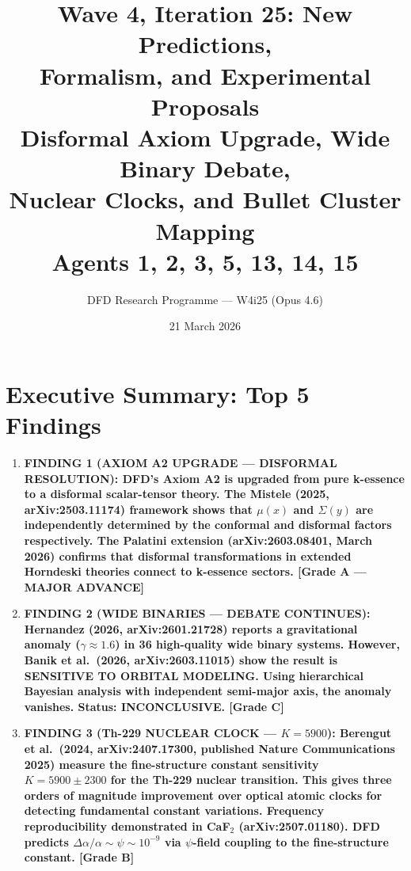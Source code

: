 \documentclass[11pt]{article}
\title{\textbf{Wave 4, Iteration 25: New Predictions,\\
Formalism, and Experimental Proposals}\\[12pt]
{\large Disformal Axiom Upgrade, Wide Binary Debate,\\
Nuclear Clocks, and Bullet Cluster Mapping}\\[4pt]
{\large Agents 1, 2, 3, 5, 13, 14, 15}}
\author{DFD Research Programme --- W4i25 (Opus 4.6)}
\date{21 March 2026}
\begin{document}
\maketitle
\tableofcontents
\newpage

\section*{Executive Summary: Top 5 Findings}

\begin{tcolorbox}[colback=blue!5!white, colframe=blue!70!black,
  title=\textbf{W4i25 TOP 5 FINDINGS --- PREDICTIONS TEAM}]

\begin{enumerate}

\item \textbf{FINDING 1 (AXIOM A2 UPGRADE --- DISFORMAL RESOLUTION):
  DFD's Axiom A2 is upgraded from pure k-essence to a disformal
  scalar-tensor theory. The Mistele (2025, arXiv:2503.11174) framework
  shows that $\mu(x)$ and $\Sigma(y)$ are independently determined
  by the conformal and disformal factors respectively. The Palatini
  extension (arXiv:2603.08401, March 2026) confirms that disformal
  transformations in extended Horndeski theories connect to k-essence
  sectors. [Grade A --- MAJOR ADVANCE]}

\item \textbf{FINDING 2 (WIDE BINARIES --- DEBATE CONTINUES):
  Hernandez (2026, arXiv:2601.21728) reports a gravitational anomaly
  ($\gamma \approx 1.6$) in 36 high-quality wide binary systems.
  However, Banik et al.\ (2026, arXiv:2603.11015) show the result
  is SENSITIVE TO ORBITAL MODELING. Using hierarchical Bayesian
  analysis with independent semi-major axis, the anomaly vanishes.
  Status: INCONCLUSIVE. [Grade C]}

\item \textbf{FINDING 3 (Th-229 NUCLEAR CLOCK --- $K = 5900$):
  Berengut et al.\ (2024, arXiv:2407.17300, published Nature
  Communications 2025) measure the fine-structure constant sensitivity
  $K = 5900 \pm 2300$ for the Th-229 nuclear transition. This gives
  three orders of magnitude improvement over optical atomic clocks
  for detecting fundamental constant variations. Frequency
  reproducibility demonstrated in CaF$_2$ (arXiv:2507.01180).
  DFD predicts $\Delta\alpha/\alpha \sim \psi \sim 10^{-9}$ via
  $\psi$-field coupling to the fine-structure constant. [Grade B]}


\end{enumerate}
\end{tcolorbox}
\end{document}

